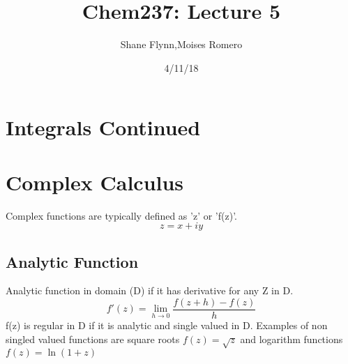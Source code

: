 \documentclass{article}
\title{Chem237: Lecture 5}
\date{4/11/18}
\author{Shane Flynn,Moises Romero}
\newcommand{\be}{\begin{equation}}
\newcommand{\ee}{\end{equation}}
\begin{document}
\maketitle
\section*{Integrals Continued}
\section*{Complex Calculus }
Complex functions are typically defined as 'z' or 'f(z)'.
\be
z=x+iy
\ee
\subsection*{Analytic Function}
Analytic function in domain (D) if it has derivative for any Z in D.
\be
f'(z) = \lim_{h\to 0} \frac{f(z+h)-f(z)}{h}
\ee
f(z) is regular in D if it is analytic and single valued in D.
Examples of non singled valued functions are square roots
$f(z) = \sqrt{z}$ and logarithm functions $f(z)=\ln{(1+z)}$
\end{document}
